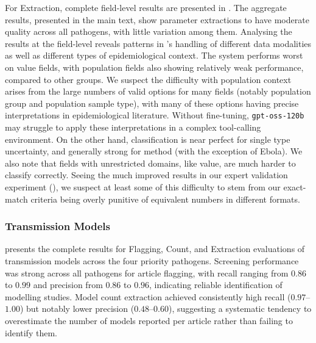 For Extraction, complete field-level results are presented in . The aggregate results, presented in the main text, show parameter extractions to have moderate quality across all pathogens, with little variation among them. Analysing the results at the field-level reveals patterns in \name{}'s handling of different data modalities as well as different types of epidemiological context. The system performs worst on value fields, with population fields also showing relatively weak performance, compared to other groups. We suspect the difficulty with population context arises from the large numbers of valid options for many fields (notably population group and population sample type), with many of these options having precise interpretations in epidemiological literature. Without fine-tuning, \texttt{gpt-oss-120b} may struggle to apply these interpretations in a complex tool-calling environment. On the other hand, classification is near perfect for single type uncertainty, and generally strong for method (with the exception of Ebola). We also note that fields with unrestricted domains, like value, are much harder to classify correctly. Seeing the much improved results in our expert validation experiment (), we suspect at least some of this difficulty to stem from our exact-match criteria being overly punitive of equivalent numbers in different formats.


\subsubsection*{Transmission Models}
 presents the complete results for Flagging, Count, and Extraction evaluations of transmission models across the four priority pathogens. Screening performance was strong across all pathogens for article flagging, with recall ranging from $0.86$ to $0.99$ and precision from $0.86$ to $0.96$, indicating reliable identification of modelling studies. Model count extraction achieved consistently high recall ($0.97$--$1.00$) but notably lower precision ($0.48$--$0.60$), suggesting a systematic tendency to overestimate the number of models reported per article rather than failing to identify them.


